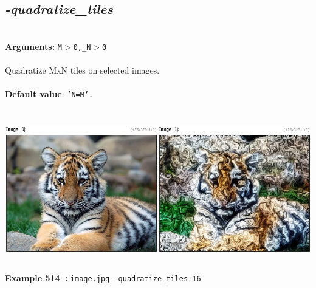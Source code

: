 \documentclass[a4paper,11pt,twoside]{book}
\begin{document}
\subsection{\emph{-quadratize\_tiles} }\vspace*{-0.5em}
~\\\textbf{Arguments: } 
{\small \texttt{M$>$0,\_N$>$0}}\\~\\
Quadratize MxN tiles on selected images.
~\\~\\\textbf{Default value}: {\small \texttt{'N=M'.}}
\begin{center}\includegraphics[keepaspectratio=true,height=7cm,width=\textwidth]{img/gmic_def514.jpg}\\
{\footnotesize \textbf{Example 514~:} \texttt{image.jpg --quadratize\_tiles 16}}
\end{center}
\end{document}
